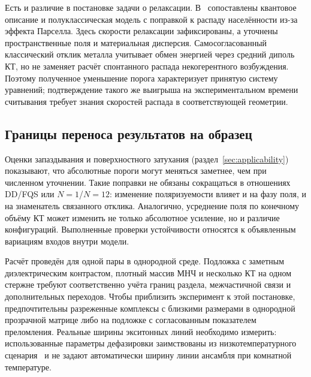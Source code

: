 Есть и различие в постановке задачи о релаксации. В~\cite{shah2013}
сопоставлены квантовое описание и полуклассическая модель с поправкой
к распаду населённости из-за эффекта Парселла. Здесь скорости релаксации
зафиксированы, а уточнены пространственные поля и материальная дисперсия.
Самосогласованный классический отклик металла учитывает обмен энергией
через средний диполь КТ, но не заменяет расчёт спонтанного распада
некогерентного возбуждения. Поэтому полученное уменьшение порога
характеризует принятую систему уравнений; подтверждение такого же
выигрыша на экспериментальном времени считывания требует знания
скоростей распада в соответствующей геометрии.

\subsection{Границы переноса результатов на образец}
\label{sec:disc-limits}

Оценки запаздывания и поверхностного затухания
(раздел~\ref{sec:applicability}) показывают, что абсолютные пороги могут
меняться заметнее, чем при численном уточнении. Такие поправки не обязаны
сокращаться в отношениях DD/FQS или $N=1$/$N=12$: изменение поляризуемости
влияет и на фазу поля, и на знаменатель связанного отклика. Аналогично,
усреднение поля по конечному объёму КТ может изменить не только абсолютное
усиление, но и различие конфигураций. Выполненные проверки устойчивости
относятся к объявленным вариациям входов внутри модели.

Расчёт проведён для одной пары в однородной среде. Подложка с заметным
диэлектрическим контрастом, плотный массив МНЧ и несколько КТ на одном
стержне требуют соответственно учёта границ раздела, межчастичной связи
и дополнительных переходов. Чтобы приблизить эксперимент к этой
постановке, предпочтительны разреженные комплексы с близкими размерами
в однородной прозрачной матрице либо на подложке с согласованным
показателем преломления. Реальные ширины экситонных линий необходимо
измерить: использованные параметры дефазировки заимствованы из
низкотемпературного сценария~\cite{shah2013} и не задают автоматически
ширину линии ансамбля при комнатной температуре.


